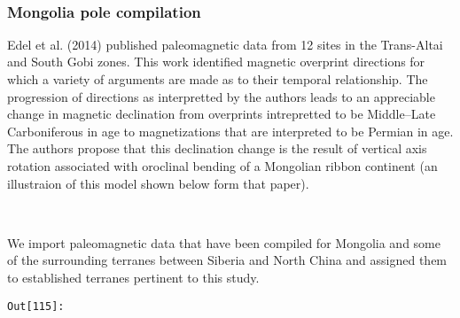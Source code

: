 \documentclass[11pt]{article}
\begin{document}
    \begin{center}
    \end{center}
    { \hspace*{\fill} \\}
    
    \subsubsection{Mongolia pole
compilation}\label{mongolia-pole-compilation}

    Edel et al. (2014) published paleomagnetic data from 12 sites in the
Trans-Altai and South Gobi zones. This work identified magnetic
overprint directions for which a variety of arguments are made as to
their temporal relationship. The progression of directions as
interpretted by the authors leads to an appreciable change in magnetic
declination from overprints intrepretted to be Middle--Late
Carboniferous in age to magnetizations that are interpreted to be
Permian in age. The authors propose that this declination change is the
result of vertical axis rotation associated with oroclinal bending of a
Mongolian ribbon continent (an illustraion of this model shown below
form that paper).


    \begin{center}
    \end{center}
    { \hspace*{\fill} \\}
    
    We import paleomagnetic data that have been compiled for Mongolia and
some of the surrounding terranes between Siberia and North China and
assigned them to established terranes pertinent to this study.

\texttt{\color{outcolor}Out[{\color{outcolor}115}]:}
    
\end{document}

